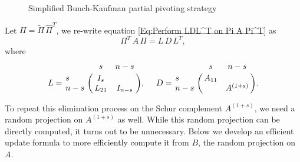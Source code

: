 \documentclass[11pt]{article}
\begin{document}
\begin{figure}[htbp]
\centering
{}
\caption{Simplified Bunch-Kaufman partial pivoting strategy}\label{alg:SBKP}
\end{figure}

Let $\Pi = \widetilde{\Pi} \, \widehat{\Pi}^T$, we re-write equation \eqref{Eq:Perform LDL^T on Pi A Pi^T} as 
\[ \Pi^T \, A \, \Pi =  L \, D \, L^T,  \]
\noindent where 
\[L = \bordermatrix{
& s & n-s \cr
s & I_s & \cr
n-s & L_{21} & I_{n-s}
},\quad 
~D = \bordermatrix{
& s & n-s \cr
s & A_{11} &  \cr
n-s &  & A^{(1 + s)}
}.\]

To repeat this elimination process on the Schur complement $A^{(1+s)}$, we need a random projection on $A^{(1+s)}$ as well. While this random projection can be directly computed, it turns out to be unnecessary. Below we develop an efficient update formula to more efficiently compute it from $B$, the random projection on $A$. 
\end{document}
